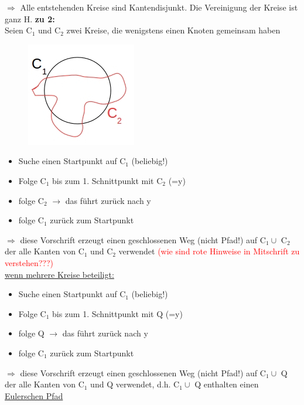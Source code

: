 $\Rightarrow$ Alle entstehenden Kreise sind Kantendisjunkt. Die Vereinigung der Kreise ist ganz H.
\newpage
\textbf{zu 2:}\\
Seien C$_1$ und C$_2$ zwei Kreise, die wenigstens einen Knoten gemeinsam haben
\begin{figure}[htp]
\centering
\includegraphics[scale=0.75]{lectures/161104/pix/pic4.jpg}
\end{figure}

\begin{itemize}
	\item Suche einen Startpunkt auf C$_1$ (beliebig!)
	\item Folge C$_1$ bis zum 1. Schnittpunkt mit C$_2$ (=y)
	\item folge C$_2$ $\rightarrow$ das führt zurück nach y
	\item folge C$_1$ zurück zum Startpunkt
\end{itemize}

$\Rightarrow$ diese Vorschrift erzeugt einen geschlossenen Weg (nicht Pfad!) auf C$_1 \cup$ C$_2$ der alle Kanten von C$_1$ und C$_2$ verwendet \textcolor{red}{(wie sind rote Hinweise in Mitschrift zu verstehen???)}\\

\underline{wenn mehrere Kreise beteiligt:}\\
\begin{itemize}
	\item Suche einen Startpunkt auf C$_1$ (beliebig!)
	\item Folge C$_1$ bis zum 1. Schnittpunkt mit Q (=y)
	\item folge Q $\rightarrow$ das führt zurück nach y
	\item folge C$_1$ zurück zum Startpunkt
\end{itemize}

$\Rightarrow$ diese Vorschrift erzeugt einen geschlossenen Weg (nicht Pfad!) auf C$_1 \cup$ Q der alle Kanten von C$_1$ und Q verwendet, d.h. C$_1 \cup$ Q enthalten einen \underline{Eulerschen Pfad}\\

